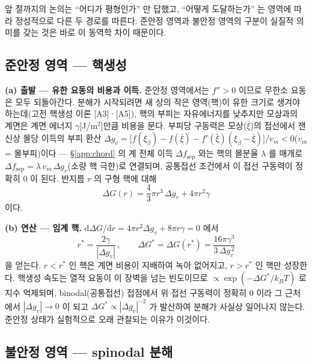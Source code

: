 \documentclass[11pt,a4paper]{article}
\newcommand{\dd}{\mathrm{d}}
\begin{document}
앞 절까지의 논의는 ``어디가 평형인가'' 만 답했고, ``어떻게 도달하는가'' 는 영역에 따라 정성적으로
다른 두 경로를 따른다. 준안정 영역과 불안정 영역의 구분이 실질적 의미를 갖는 것은 바로 이 동역학
차이 때문이다.

\subsection{준안정 영역 --- 핵생성}\label{app:nucleation}

\textbf{(a) 출발 --- 유한 요동의 비용과 이득.} 준안정 영역에서는 $f''>0$ 이므로 무한소 요동은 모두
되돌아간다. 분해가 시작되려면 새 상의 작은 영역(핵)이 유한 크기로 생겨야 하는데(고전 핵생성 이론 [A3]·[A5]), 핵의
부피는 자유에너지를 낮추지만 모상과의 계면은 계면 에너지 $\gamma$[J/m$^2$]만큼 비용을 문다. 부피당
구동력은 모상($\bar\xi$)의 접선에서 잰 신상 몰당 이득의 부피 환산
$\Delta g_v=\bigl[f(\xi_\beta)-f(\bar\xi)-f'(\bar\xi)(\xi_\beta-\bar\xi)\bigr]/v_m<0$($v_m$ = 몰부피)이다
--- \S\ref{app:chord} 의 계 전체 이득 $\Delta f_\mathrm{sep}$ 와는 핵의 몰분율 $\lambda$ 를 매개로
$\Delta f_\mathrm{sep}=\lambda\,v_m\,\Delta g_v$(소량 핵 극한)로 연결되며, 공통접선 조건에서 이 접선
구동력이 정확히 $0$ 이 된다. 반지름 $r$ 의 구형 핵에 대해
\begin{equation}
\Delta G(r)=\frac{4}{3}\pi r^3\,\Delta g_v+4\pi r^2\gamma
\label{eq:app-cnt}
\end{equation}
이다.

\textbf{(b) 연산 --- 임계 핵.} $\dd\Delta G/\dd r=4\pi r^2\Delta g_v+8\pi r\gamma=0$ 에서
\begin{equation}
r^\ast=\frac{2\gamma}{|\Delta g_v|}\,,\qquad
\Delta G^\ast=\Delta G(r^\ast)=\frac{16\pi\gamma^3}{3\,\Delta g_v^{\,2}}
\label{eq:app-rstar}
\end{equation}
을 얻는다. $r<r^\ast$ 인 핵은 계면 비용이 지배하여 녹아 없어지고, $r>r^\ast$ 인 핵만 성장한다. 핵생성
속도는 열적 요동이 이 장벽을 넘는 빈도이므로 $\propto\exp(-\Delta G^\ast/k_BT)$ 로 지수 억제되며,
binodal(공통접선) 접점에서 위 접선 구동력이 정확히 $0$ 이라 그 근처에서
$|\Delta g_v|\to0$ 이 되고 $\Delta G^\ast\propto|\Delta g_v|^{-2}$ 가 발산하여
분해가 사실상 일어나지 않는다. 준안정 상태가 실험적으로 오래 관찰되는 이유가 이것이다.

\subsection{불안정 영역 --- spinodal 분해}\label{app:spindecomp}
\end{document}
